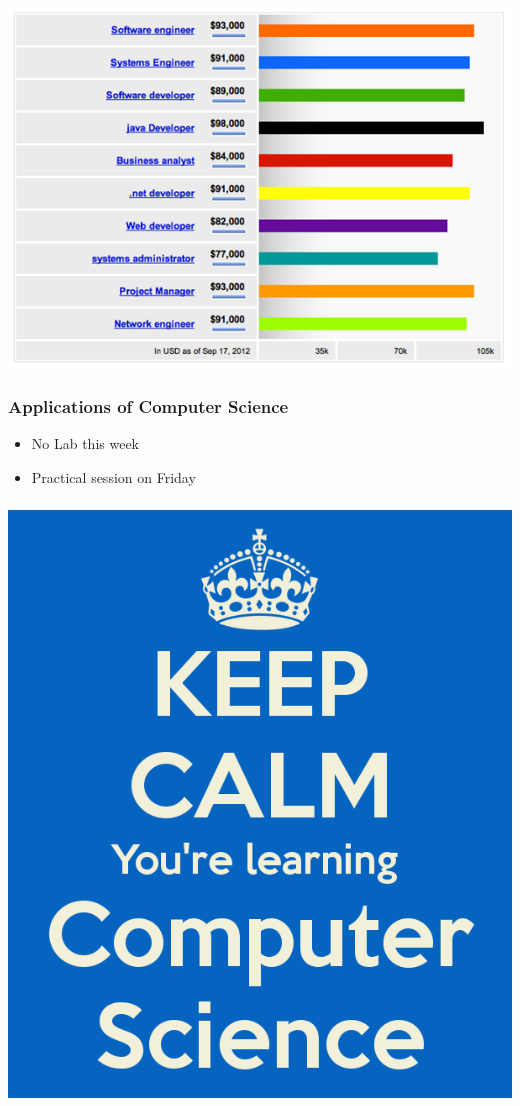 \documentclass{beamer}
\begin{document}
\begin{frame}
  \frametitle{}
\begin{center}
\includegraphics[scale=0.7]{images/job2}
\end{center}
\end{frame}
\begin{frame}
  \frametitle{Applications of Computer Science}
  \begin{itemize}
		\item No Lab this week
		\item Practical session on Friday
    \end{itemize}
\end{frame}
\begin{frame}
  \frametitle{}
\begin{center}
\includegraphics[scale=0.3]{images/calm}
\end{center}
\end{frame}
\end{document}
